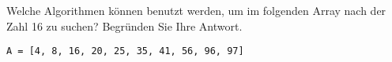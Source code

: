 %
%
Welche Algorithmen können benutzt werden, um im folgenden Array nach der Zahl \num{16} zu suchen? Begründen Sie Ihre Antwort.

\begin{center}
\lstinline[language=pseudocode]{A = [4, 8, 16, 20, 25, 35, 41, 56, 96, 97]}
\end{center}

\fillwithgrid{0.5in}

